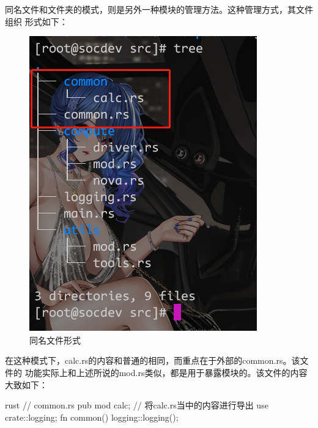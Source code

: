 同名文件和文件夹的模式，则是另外一种模块的管理方法。这种管理方式，其文件组织
形式如下：
\begin{figure}[H]
  \centering
  \includegraphics[width=\linewidth]{rust_mod_file.png}
  \caption{同名文件形式}
  \label{fig:rust_mod_file}
\end{figure}
在这种模式下，calc.rs的内容和普通的相同，而重点在于外部的common.rs。该文件的
功能实际上和上述所说的mod.rs类似，都是用于暴露模块的。该文件的内容大致如下：
\begin{code-block}{rust}
// common.rs
pub mod calc; // 将calc.rs当中的内容进行导出
use crate::logging;
fn common() { logging::logging(); }
\end{code-block}

